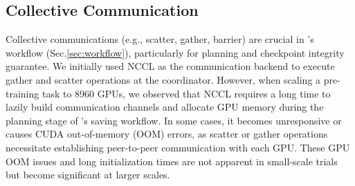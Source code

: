 
\subsection{Collective Communication}
\label{sec:opt_cc}

Collective communications (e.g., scatter, gather, barrier) are crucial in \sys{}'s workflow (Sec.\ref{sec:workflow}), particularly for planning and checkpoint integrity guarantee.
We initially used NCCL\cite{nccl} as the communication backend to execute gather and scatter operations at the coordinator. However, when scaling a pre-training task to 8960 GPUs, we observed that NCCL requires a long time to lazily build communication channels and allocate GPU memory during the planning stage of \sys{}'s saving workflow. In some cases, it becomes unresponsive or causes CUDA out-of-memory (OOM) errors, as scatter or gather operations necessitate establishing peer-to-peer communication with each GPU. These GPU
OOM issues and long initialization times are not apparent in small-scale trials but become significant at larger scales.

